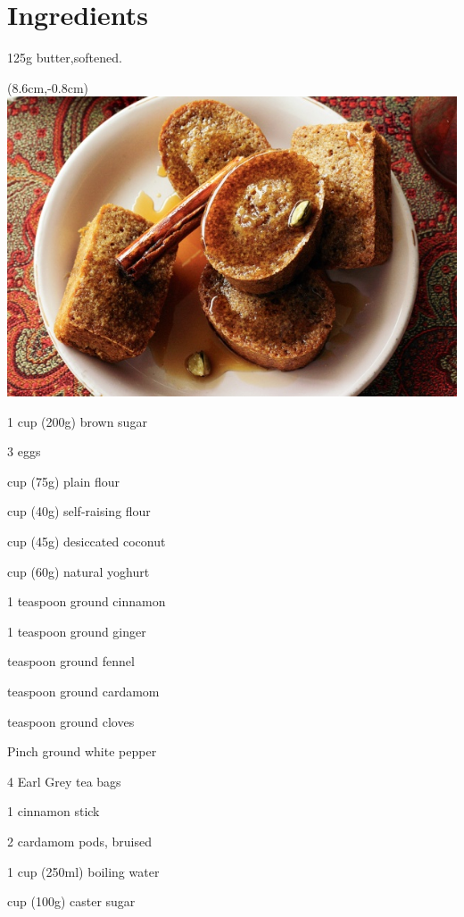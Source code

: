 
\bigskip
\section*{Ingredients}

\begin{ingredients-list}
	\item 125g butter,softened.
		\begin{textblock*}{8cm}(8.6cm,-0.8cm) %
			\includegraphics[scale=0.35]{./img/chai-spiced_cakes.jpg}
		\end{textblock*}
	\item 1 cup (200g) brown sugar
	\item 3 eggs
	\item {} cup (75g) plain flour
	\item {} cup (40g) self-raising flour
	\item {} cup (45g) desiccated coconut
	\item {} cup (60g) natural yoghurt
	\item 1 teaspoon ground cinnamon
	\item 1 teaspoon ground ginger
	\item {} teaspoon ground fennel
	\item {} teaspoon ground cardamom
	\item {} teaspoon ground cloves
	\item Pinch ground white pepper
	\item 4 Earl Grey tea bags
	\item 1 cinnamon stick
	\item 2 cardamom pods, bruised
	\item 1 cup (250ml) boiling water
	\item {} cup (100g) caster sugar 
\end{ingredients-list}

